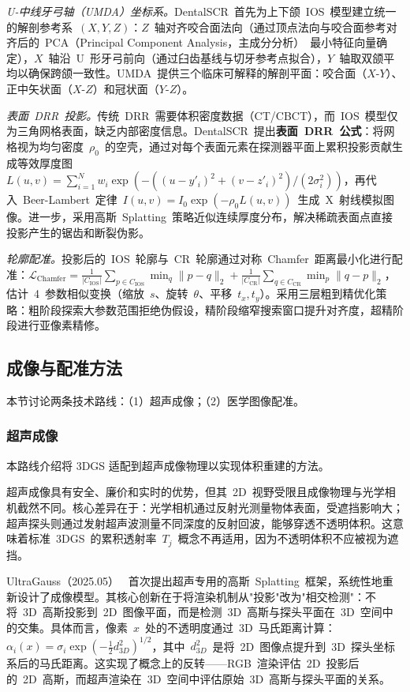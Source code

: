 \textit{U-中线牙弓轴（UMDA）坐标系。}DentalSCR~首先为上下颌~IOS~模型建立统一的解剖参考系~$(X, Y, Z)$：$Z$~轴对齐咬合面法向（通过顶点法向与咬合面参考对齐后的~PCA（Principal Component Analysis，主成分分析）~最小特征向量确定），$X$~轴沿~U~形牙弓前向（通过臼齿基线与切牙参考点拟合），$Y$~轴取双颌平均以确保跨颌一致性。UMDA~提供三个临床可解释的解剖平面：咬合面（$X$-$Y$）、正中矢状面（$X$-$Z$）和冠状面（$Y$-$Z$）。

\textit{表面~DRR~投影。}传统~DRR~需要体积密度数据（CT/CBCT），而~IOS~模型仅为三角网格表面，缺乏内部密度信息。DentalSCR~提出\textbf{表面~DRR~公式}：将网格视为均匀密度~$\rho_0$~的空壳，通过对每个表面元素在探测器平面上累积投影贡献生成等效厚度图~$L(u,v) = \sum_{i=1}^{N} w_i \exp(-((u - y'_i)^2 + (v - z'_i)^2)/(2\sigma_i^2))$，再代入~Beer-Lambert~定律~$I(u,v) = I_0 \exp(-\rho_0 L(u,v))$~生成~X~射线模拟图像。进一步，采用高斯~Splatting~策略近似连续厚度分布，解决稀疏表面点直接投影产生的锯齿和断裂伪影。

\textit{轮廓配准。}投影后的~IOS~轮廓与~CR~轮廓通过对称~Chamfer~距离最小化进行配准：$\mathcal{L}_{\text{Chamfer}} = \frac{1}{|C_{\text{IOS}}|}\sum_{p \in C_{\text{IOS}}}\min_q \|p-q\|_2 + \frac{1}{|C_{\text{CR}}|}\sum_{q \in C_{\text{CR}}}\min_p \|q-p\|_2$，估计~4~参数相似变换（缩放~$s$、旋转~$\theta$、平移~$t_x, t_y$）。采用三层粗到精优化策略：粗阶段探索大参数范围拒绝伪假设，精阶段缩窄搜索窗口提升对齐度，超精阶段进行亚像素精修。

\subsection{成像与配准方法}
\label{ss:19_8}

本节讨论两条技术路线：（1）超声成像；（2）医学图像配准。

\subsubsection{超声成像}

本路线介绍将 3DGS 适配到超声成像物理以实现体积重建的方法。

超声成像具有安全、廉价和实时的优势，但其~2D~视野受限且成像物理与光学相机截然不同。核心差异在于：光学相机通过反射光测量物体表面，受遮挡影响大；超声探头则通过发射超声波测量不同深度的反射回波，能够穿透不透明体积。这意味着标准~3DGS~的累积透射率~$T_j$~概念不再适用，因为不透明体积不应被视为遮挡。

UltraGauss（2025.05）~\cite{2505_05643} 首次提出超声专用的高斯~Splatting~框架，系统性地重新设计了成像模型。其核心创新在于将渲染机制从"投影"改为"相交检测"：不将~3D~高斯投影到~2D~图像平面，而是检测~3D~高斯与探头平面在~3D~空间中的交集。具体而言，像素~$x$~处的不透明度通过~3D~马氏距离计算：$\alpha_i(x) = \sigma_i \exp(-\frac{1}{2} d_{3D}^2)^{1/2}$，其中~$d_{3D}^2$~是将~2D~图像点提升到~3D~探头坐标系后的马氏距离。这实现了概念上的反转——RGB~渲染评估~2D~投影后的~2D~高斯，而超声渲染在~3D~空间中评估原始~3D~高斯与探头平面的关系。

